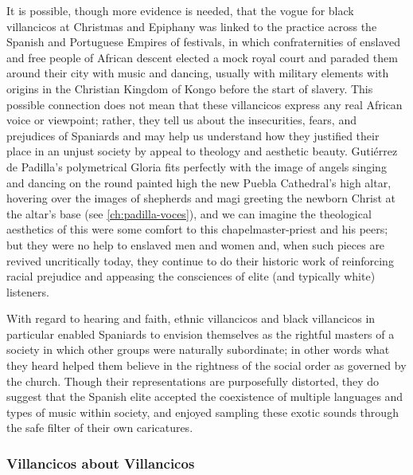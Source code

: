 It is possible, though more evidence is needed, that the vogue for black
villancicos at Christmas and Epiphany was linked to the practice across the
Spanish and Portuguese Empires of  festivals, in which
confraternities of enslaved and free people of African descent elected a mock
royal court and paraded them around their city with music and dancing, usually
with military elements with origins in the Christian Kingdom of Kongo before
the start of slavery.%
    \citXXX[sources]
This possible connection does not mean that these villancicos express any real
African voice or viewpoint; rather, they tell us about the insecurities, fears,
and prejudices of Spaniards and may help us understand how they justified their
place in an unjust society by appeal to theology and aesthetic beauty.
Gutiérrez de Padilla's polymetrical Gloria fits perfectly with the image of
angels singing and dancing on the round painted high the new Puebla
Cathedral's high altar, hovering over the images of shepherds and magi greeting
the newborn Christ at the altar's base (see \cref{ch:padilla-voces}), and we
can imagine the theological aesthetics of this were some comfort to this
chapelmaster-priest and his peers; but they were no help to enslaved men and
women and, when such pieces are revived uncritically today, they continue to do
their historic work of reinforcing racial prejudice and appeasing the
consciences of elite (and typically white) listeners.

With regard to hearing and faith, ethnic villancicos and black villancicos in
particular enabled Spaniards to envision themselves as the rightful masters of
a society in which other groups were naturally subordinate; in other words what
they heard helped them believe in the rightness of the social order as governed
by the church. %
Though their representations are purposefully distorted, they do suggest that
the Spanish elite accepted the coexistence of multiple languages and types of
music within society, and enjoyed sampling these exotic sounds through the safe
filter of their own caricatures.

\subsubsection{Villancicos about Villancicos}

